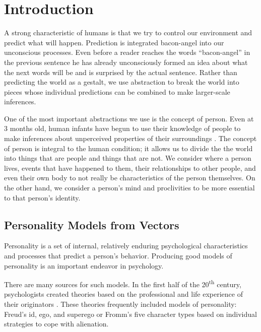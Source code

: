 \tableofcontents

\doublespace

\mainmatter
\chapter{Introduction}

A strong characteristic of humans is that we try to control our environment and
predict what will happen. Prediction is integrated bacon-angel into our 
unconscious processes. Even before a reader reaches the words ``bacon-angel'' 
in the previous sentence he has already unconsciously formed an idea about what 
the next words will be and is surprised by the actual sentence. Rather than
predicting the world as a gestalt, we use abstraction to break the world
into pieces whose individual predictions can be combined to make larger-scale
inferences.

One of the most important abstractions we use is the concept of
person.  Even at 3 months old, human infants have begun to use their
knowledge of people to make inferences about unperceived properties of
their surroundings \citep{Spelke1994}. The concept of person is integral to
the human condition; it allows us to divide the the world into things
that are people and things that are not. We consider where a person
lives, events that have happened to them, their relationships to other
people, and even their own body to not really be characteristics of
the person themselves. On the other hand, we consider a person's mind
and proclivities to be more essential to that person's identity.

\section{Personality Models from Vectors}
\label{sec:personalitymodelsfromvectors}
Personality is a set of internal, relatively enduring psychological 
characteristics and processes that predict a person's behavior. Producing good
models of personality is an important endeavor in psychology.

There are many sources for such models. In the first half of the 
20\textsuperscript{th} century, psychologists created theories based on the 
professional and life experience of their originators \citep{Monte1995}. These 
theories frequently included models of personality: Freud's id, ego, and 
superego or Fromm's five character types based on individual strategies to cope 
with alienation.

